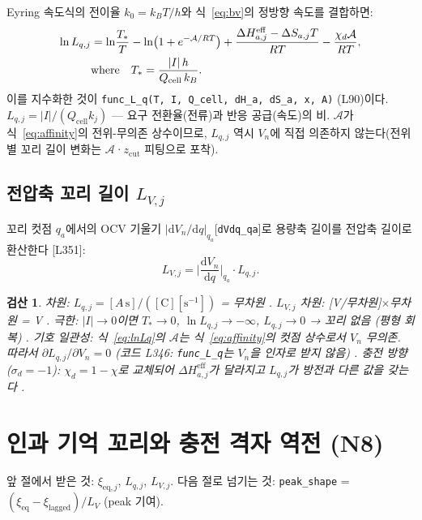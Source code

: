 \documentclass[11pt,a4paper]{article}
\newtheorem*{verifybox}{검산}
\newcommand{\dd}{\mathrm{d}}
\newcommand{\eff}{\mathrm{eff}}
\newcommand{\eq}{\mathrm{eq}}
\newcommand{\cell}{\mathrm{cell}}
\begin{document}
Eyring 속도식의 전이율 $k_0 = k_BT/h$와 식~\eqref{eq:bv}의 정방향 속도를 결합하면:
\begin{align}
  \ln L_{q,j} &= \ln\!\frac{T_*}{T} - \ln\!\big(1+e^{-\mathcal{A}/RT}\big)
    + \frac{\Delta H_{a,j}^{\eff}-\Delta S_{a,j}T}{RT} - \frac{\chi_d\mathcal{A}}{RT},
  \label{eq:lnLq}\\
  &\text{where}\quad T_* = \frac{|I|\,h}{Q_\cell\,k_B}.
  \notag
\end{align}
이를 지수화한 것이 \texttt{func\_L\_q(T, I, Q\_cell, dH\_a, dS\_a, x, A)} (L90)이다.
$L_{q,j} = |I|/(Q_\cell k_j)$ — 요구 전환율(전류)과 반응 공급(속도)의 비.
$\mathcal{A}$가 식~\eqref{eq:affinity}의 전위-무의존 상수이므로, $L_{q,j}$ 역시
$V_n$에 직접 의존하지 않는다(전위별 꼬리 길이 변화는 $\mathcal{A}$·$z_{\mathrm{cut}}$ 피팅으로 포착).

\subsection{전압축 꼬리 길이 $L_{V,j}$}

꼬리 컷점 $q_a$에서의 OCV 기울기 $|\dd V_n/\dd q|_{q_a}$[\texttt{dVdq\_qa}]로
용량축 길이를 전압축 길이로 환산한다 [L351]:
\begin{equation}
  L_{V,j} = \Big|\frac{\dd V_n}{\dd q}\Big|_{q_a} \cdot L_{q,j}.
  \label{eq:LV}
\end{equation}

\begin{verifybox}
차원: $L_{q,j} = [A\,\mathrm{s}]/([\mathrm{C}][\mathrm{s}^{-1}])$ = 무차원 \checkmark.
$L_{V,j}$ 차원: [V/무차원]$\times$무차원 = V \checkmark.
극한: $|I|\to0$이면 $T_*\to0$, $\ln L_{q,j}\to-\infty$,
$L_{q,j}\to0$ → 꼬리 없음 (평형 회복) \checkmark.
기호 일관성: 식~\eqref{eq:lnLq}의 $\mathcal{A}$는 식~\eqref{eq:affinity}의
컷점 상수로서 $V_n$ 무의존. 따라서 $\partial L_{q,j}/\partial V_n = 0$
(코드 L346: \texttt{func\_L\_q}는 $V_n$을 인자로 받지 않음) \checkmark.
충전 방향 ($\sigma_d=-1$): $\chi_d = 1-\chi$로 교체되어 $\Delta H_{a,j}^{\eff}$가
달라지고 $L_{q,j}$가 방전과 다른 값을 갖는다 \checkmark.
\end{verifybox}

\section{인과 기억 꼬리와 충전 격자 역전 (N8)}
\label{sec:tail}
앞 절에서 받은 것: $\xi_{\eq,j}$, $L_{q,j}$, $L_{V,j}$.
다음 절로 넘기는 것: \texttt{peak\_shape} = $(ξ_{\eq}-ξ_{\mathrm{lagged}})/L_V$ (peak 기여).
\end{document}
